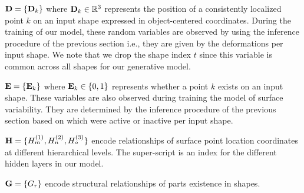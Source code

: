 \begin{description}[leftmargin=1em]
\setlength{\itemsep}{4pt}
\setlength{\parskip}{0pt}
\setlength{\parsep}{0pt}
\item[Surface point positions] $\mathbf{D} = \{\mathbf{D}_{k}\}$ where $\mathbf{D}_{k} \in \mathbb{R}^3$ represents the position of a consistently localized point $k$ on an input shape expressed in object-centered coordinates. During the training of our model, these random variables are observed by using the inference procedure of the previous section i.e., they are given by the  deformations per input shape. We note that we drop the shape index $t$ since this variable is common across all shapes for our generative model. 
\item[Surface point existences] $\mathbf{E} = \{\mathbf{E}_{k}\}$ where $\mathbf{E}_{k} \in \{0,1\}$ represents whether a point $k$ exists on an input shape. These variables are also observed during training the model of surface variability. They are determined by the inference procedure of the previous section based on which  were active or inactive per input shape. 
\item[Latent variables for geometry] $\mathbf{H} = \{H_m^{(1)},H_n^{(2)},H_o^{(3)}\}$ encode relationships of surface point location coordinates at different hierarchical levels. The super-script is an index for the different hidden layers in our model. 
\item[Latent variables for structure] $\mathbf{G} = \{G_r\}$ encode structural relationships of parts existence in shapes.
\end{description}

